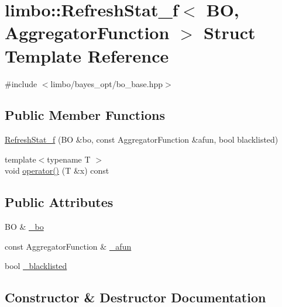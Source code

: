\hypertarget{structlimbo_1_1_refresh_stat__f}{}\section{limbo\+:\+:Refresh\+Stat\+\_\+f$<$ B\+O, Aggregator\+Function $>$ Struct Template Reference}
\label{structlimbo_1_1_refresh_stat__f}


{\ttfamily \#include $<$limbo/bayes\+\_\+opt/bo\+\_\+base.\+hpp$>$}

\subsection*{Public Member Functions}
\begin{DoxyCompactItemize}
\item 
\hyperlink{structlimbo_1_1_refresh_stat__f_af0f6e976aa3f357cdd4418d84e1e69ec}{Refresh\+Stat\+\_\+f} (B\+O \&bo, const Aggregator\+Function \&afun, bool blacklisted)
\item 
{\footnotesize template$<$typename T $>$ }\\void \hyperlink{structlimbo_1_1_refresh_stat__f_a24498c1e97e8aa89a8180422a3ad9109}{operator()} (T \&x) const 
\end{DoxyCompactItemize}
\subsection*{Public Attributes}
\begin{DoxyCompactItemize}
\item 
B\+O \& \hyperlink{structlimbo_1_1_refresh_stat__f_ad94ccf3c46dbed8e9f8ab573af8fb258}{\+\_\+bo}
\item 
const Aggregator\+Function \& \hyperlink{structlimbo_1_1_refresh_stat__f_af02fdc84a4066c199d26e823b9887531}{\+\_\+afun}
\item 
bool \hyperlink{structlimbo_1_1_refresh_stat__f_aa4cc189ccbdbcd4d3cbefa54fae1f9f3}{\+\_\+blacklisted}
\end{DoxyCompactItemize}


\subsection{Constructor \& Destructor Documentation}
\hypertarget{structlimbo_1_1_refresh_stat__f_af0f6e976aa3f357cdd4418d84e1e69ec}{}
